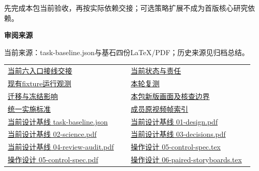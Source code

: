 \documentclass[11pt,a4paper]{article}
\newcommand{\reviewsubsection}[1]{\par\Needspace{4\baselineskip}\vspace{4pt}\begin{center}{\titlelatin\titlecjk\bfseries\fontsize{12}{18}\selectfont #1}\end{center}}
\begin{document}
先完成本包当前验收，再按实际依赖交接；可选策略扩展不成为首版核心研究依赖。


\begin{minipage}{\linewidth}
\reviewsubsection{3.4 审阅来源}
当前来源：task-\allowbreak{}baseline.json与基石四份LaTeX/\allowbreak{}PDF；历史来源见归档总结。


\begingroup\small\setlength{\tabcolsep}{4pt}\begin{tabular}{@{}p{0.48\linewidth}p{0.48\linewidth}@{}}
\href{file:///D:/Agent/srp/agent/tasks/U12-06/outputs/current-runtime.md}{当前六入口接线交接} & \href{file:///D:/Agent/srp/agent/tasks/U12-06/outputs/current-runtime.json}{当前状态与责任}\\[4pt]
\href{file:///D:/Agent/srp/agent/tasks/U12-06/evidence/runtime-observations.json}{现有fixture运行观测} & \href{file:///D:/Agent/srp/agent/tasks/U12-06/evidence/verification.json}{本轮复测}\\[4pt]
\href{file:///D:/Agent/srp/agent/tasks/U12-06/evidence/consumer-impact.md}{迁移与冻结影响} & \href{file:///D:/Agent/srp/agent/tasks/U12-06/outputs/current-implementation-evidence.md}{本包新版画面及核查边界}\\[4pt]
\href{file:///D:/Agent/srp/agent/design/weather/2026-10-08_Storm\%E4\%B8\%8E\%E7\%BA\%AF\%E7\%B2\%92\%E5\%AD\%90\%E5\%8F\%8C\%E7\%8E\%AF\%E5\%AE\%9E\%E6\%96\%BD\%E6\%A0\%87\%E5\%87\%86.md}{统一实施标准} & \href{file:///D:/Agent/srp/human/assets/previews/2026-10-08/member-storm-particle-rings/frame-index.json}{成员原视频帧索引}\\[4pt]
\href{file:///D:/Agent/srp/agent/design/design-foundation-20261008/task-baseline.json}{当前设计基线 task-\allowbreak{}baseline.json} & \href{file:///D:/Agent/srp/agent/design/design-foundation-20261008/01-design.pdf}{当前设计基线 01-\allowbreak{}design.pdf}\\[4pt]
\href{file:///D:/Agent/srp/agent/design/design-foundation-20261008/02-science.pdf}{当前设计基线 02-\allowbreak{}science.pdf} & \href{file:///D:/Agent/srp/agent/design/design-foundation-20261008/03-decisions.pdf}{当前设计基线 03-\allowbreak{}decisions.pdf}\\[4pt]
\href{file:///D:/Agent/srp/agent/design/design-foundation-20261008/04-review-audit.pdf}{当前设计基线 04-\allowbreak{}review-\allowbreak{}audit.pdf} & \href{file:///D:/Agent/srp/agent/design/design-foundation-20261008/05-control-spec.tex}{操作设计 05-\allowbreak{}control-\allowbreak{}spec.tex}\\[4pt]
\href{file:///D:/Agent/srp/agent/design/design-foundation-20261008/05-control-spec.pdf}{操作设计 05-\allowbreak{}control-\allowbreak{}spec.pdf} & \href{file:///D:/Agent/srp/agent/design/design-foundation-20261008/06-paired-storyboards.tex}{操作设计 06-\allowbreak{}paired-\allowbreak{}storyboards.tex}\\[4pt]

\end{tabular}
\end{minipage}
\end{document}
